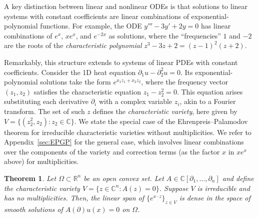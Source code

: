 \documentclass{article} %
\theoremstyle{plain}
\newtheorem{theorem}{Theorem}[section]
\newtheorem{lemma}[theorem]{Lemma}
\theoremstyle{definition}
\theoremstyle{remark}
\DeclareMathOperator*{\F}{\mathcal{F}}
\DeclareMathOperator{\GP}{GP}
\newcommand{\CC}{\mathbb{C}}
\newcommand{\RR}{\mathbb{R}}
\begin{document}
A key distinction between linear and nonlinear ODEs is that solutions to linear systems with constant coefficients are linear combinations of exponential-polynomial functions. For example, the ODE $y''' - 3y' + 2y = 0$ has linear combinations of $e^x$, $xe^x$, and $e^{-2x}$ as solutions, where the ``frequencies'' $1$ and $-2$ are the roots of the \emph{characteristic polynomial} $z^3 - 3z + 2 = (z - 1)^2(z + 2)$.

Remarkably, this structure extends to systems of linear PDEs with constant coefficients. Consider the 1D heat equation $\partial_1 u - \partial_2^2 u = 0$. Its exponential-polynomial solutions take the form $e^{x_1 z_1 + x_2 z_2}$, where the frequency vector $(z_1, z_2)$ satisfies the characteristic equation $z_1 - z_2^2 = 0$. This equation arises substituting each derivative $\partial_i$ with a complex variable $z_i$, akin to a Fourier transform. The set of such $z$ defines the \emph{characteristic variety}, here given by $V = \{(z_2^2, z_2)\colon z_2 \in \CC\}$.
We state the special case of the Ehrenpreis--Palamodov theorem for irreducible characteristic varieties without multiplicities. We refer to Appendix~\ref{sec:EPGP} for the general case, which involves linear combinations over the components of the variety and correction terms (as the factor $x$ in $xe^x$ above) for multiplicities.
\begin{theorem}\label{thm:EP}
    Let $\Omega \subset \RR^n$ be an open convex set. Let $A \in \CC[\partial_1, \ldots, \partial_n]$ and define the characteristic variety $V = \{z \in \CC^n \colon A(z) = 0\}$. Suppose $V$ is irreducible and has no multiplicities. Then, the linear span of $\{e^{x \cdot z}\}_{z \in V}$ is dense in the space of smooth solutions of $A(\partial)u(x) = 0$ on $\Omega$.
\end{theorem}
\end{document}
